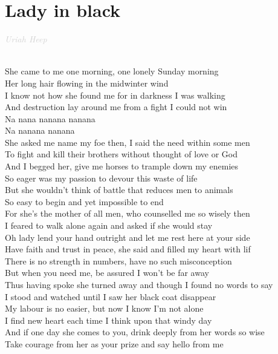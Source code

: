 \documentclass[a5paper, 10pt]{book}
\begin{document}
\section{Lady in black}\textcolor{lightgray}{\textit{Uriah Heep}}\\~\\
\begin{minipage}[t]{0.9\textwidth}
She came to me one morning, one lonely Sunday morning\\
Her long hair flowing in the midwinter wind\\
I know not how she found me for in darkness I was walking\\
And destruction lay around me from a fight I could not win\\

\hspace*{5mm} Na nana nanana nanana\\
\hspace*{5mm} Na nanana nanana\\

She asked me name my foe then, I said the need within some men\\
To fight and kill their brothers without thought of love or God\\
And I begged her, give me horses to trample down my enemies\\
So eager was my passion to devour this waste of life\\

But she wouldn't think of battle that reduces men to animals\\
So easy to begin and yet impossible to end\\
For she's the mother of all men, who counselled me so wisely then\\
I feared to walk alone again and asked if she would stay\\

Oh lady lend your hand outright and let me rest here at your side\\
Have faith and trust in peace, she said and filled my heart with lif\\
There is no strength in numbers, have no such misconception\\
But when you need me, be assured I won't be far away\\

Thus having spoke she turned away and though I found no words to say\\
I stood and watched until I saw her black coat disappear\\
My labour is no easier, but now I know I'm not alone\\
I find new heart each time I think upon that windy day\\

And if one day she comes to you, drink deeply from her words so wise\\
Take courage from her as your prize and say hello from me\\
\\
\end{minipage}
\end{document}
